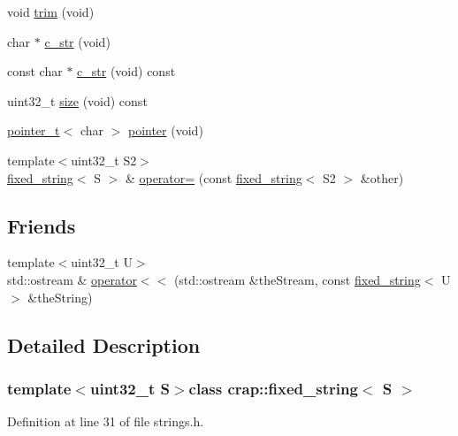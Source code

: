 \begin{DoxyCompactItemize}
\item 
void \hyperlink{classcrap_1_1fixed__string_ad197251912e23f609098bb2b4e04bf68}{trim} (void)
\item 
char $\ast$ \hyperlink{classcrap_1_1fixed__string_a9b86832ff9188b73162568865be01f7a}{c\+\_\+str} (void)
\item 
const char $\ast$ \hyperlink{classcrap_1_1fixed__string_a8829c55937c2717026e2e6a8d3fe5233}{c\+\_\+str} (void) const 
\item 
uint32\+\_\+t \hyperlink{classcrap_1_1fixed__string_acbd9ef08a9ed3c07f57a790b4b5ad97c}{size} (void) const 
\item 
\hyperlink{structcrap_1_1pointer__t}{pointer\+\_\+t}$<$ char $>$ \hyperlink{classcrap_1_1fixed__string_a9cec88717fedf7b87709e3923f208038}{pointer} (void)
\item 
{\footnotesize template$<$uint32\+\_\+t S2$>$ }\\\hyperlink{classcrap_1_1fixed__string}{fixed\+\_\+string}$<$ S $>$ \& \hyperlink{classcrap_1_1fixed__string_a34b8a9a29355cd8306d8079c3b716a47}{operator=} (const \hyperlink{classcrap_1_1fixed__string}{fixed\+\_\+string}$<$ S2 $>$ \&other)
\end{DoxyCompactItemize}
\subsection*{Friends}
\begin{DoxyCompactItemize}
\item 
{\footnotesize template$<$uint32\+\_\+t U$>$ }\\std\+::ostream \& \hyperlink{classcrap_1_1fixed__string_a3cce5de5cb783e5af2b454c992da2754}{operator$<$$<$} (std\+::ostream \&the\+Stream, const \hyperlink{classcrap_1_1fixed__string}{fixed\+\_\+string}$<$ U $>$ \&the\+String)
\end{DoxyCompactItemize}


\subsection{Detailed Description}
\subsubsection*{template$<$uint32\+\_\+t S$>$class crap\+::fixed\+\_\+string$<$ S $>$}



Definition at line 31 of file strings.\+h.



